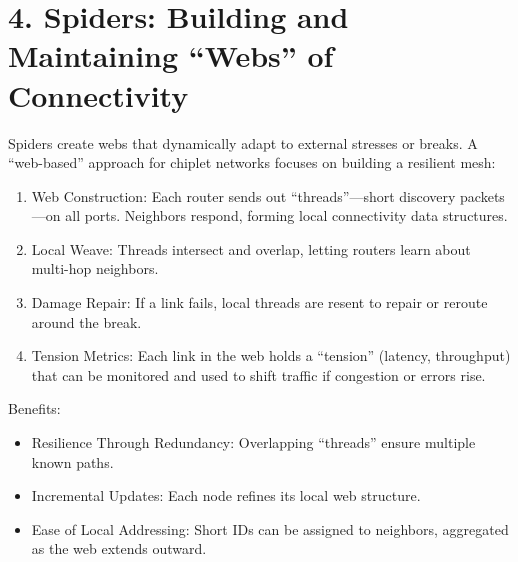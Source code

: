 \documentclass[../../../OAE-SPEC-MAIN.tex]{subfiles}
\begin{document}
\section{4. Spiders: Building and Maintaining “Webs” of Connectivity}

Spiders create webs that dynamically adapt to external stresses or breaks. A “web-based” approach for chiplet networks focuses on building a resilient mesh:

\begin{enumerate}
	\item  	Web Construction: Each router sends out “threads”—short discovery packets—on all ports. Neighbors respond, forming local connectivity data structures.
	\item  	Local Weave: Threads intersect and overlap, letting routers learn about multi-hop neighbors.
	\item  	Damage Repair: If a link fails, local threads are resent to repair or reroute around the break.
	\item  Tension Metrics: Each link in the web holds a “tension” (latency, throughput) that can be monitored and used to shift traffic if congestion or errors rise.
\end{enumerate}

Benefits:
\begin{itemize}
	\item Resilience Through Redundancy: Overlapping “threads” ensure multiple known paths.
	\item Incremental Updates: Each node refines its local web structure.
	\item Ease of Local Addressing: Short IDs can be assigned to neighbors, aggregated as the web extends outward.
\end{itemize}
\end{document}

